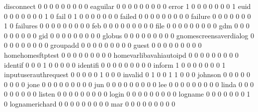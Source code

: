 \documentclass[compress,8pt]{beamer}
\begin{document}
\begin{frame}
\begin{Schunk}
  disconnect                                 0   0   0   0   0   0   0   0   0
  eaguilar                                   0   0   0   0   0   0   0   0   0
  error                                      1   0   0   0   0   0   0   0   1
  euid                                       0   0   0   0   0   0   0   1   0
  fail                                       0   1   0   0   0   0   0   0   0
  failed                                     0   0   0   0   0   0   0   0   0
  failure                                    0   0   0   0   0   0   0   1   0
  failures                                   0   0   0   0   0   0   0   0   0
  feb                                        0   0   0   0   0   0   0   0   0
  file                                       0   0   0   0   0   0   0   0   0
  gdm                                        0   0   0   0   0   0   0   0   0
  gid                                        0   0   0   0   0   0   0   0   0
  globus                                     0   0   0   0   0   0   0   0   0
  gnomescreensaverdialog                     0   0   0   0   0   0   0   0   0
  groupadd                                   0   0   0   0   0   0   0   0   0
  guest                                      0   0   0   0   0   0   0   0   0
  homehomesftptest                           0   0   0   0   0   0   0   0   0
  homevarlibavahiautoipd                     0   0   0   0   0   0   0   0   0
  identif                                    0   0   0   1   0   0   0   0   0
  identifi                                   0   0   0   0   0   0   0   0   0
  inform                                     1   0   0   0   0   0   0   0   1
  inputuserauthrequest                       0   0   0   0   0   1   0   0   0
  invalid                                    0   1   0   0   1   1   0   0   0
  johnson                                    0   0   0   0   0   0   0   0   0
  jone                                       0   0   0   0   0   0   0   0   0
  jun                                        0   0   0   0   0   0   0   0   0
  lee                                        0   0   0   0   0   0   0   0   0
  linda                                      0   0   0   0   0   0   0   0   0
  listen                                     0   0   0   0   0   0   0   0   0
  login                                      0   0   0   0   0   0   0   0   0
  logname                                    0   0   0   0   0   0   0   1   0
  lognamerichard                             0   0   0   0   0   0   0   0   0
  mar                                        0   0   0   0   0   0   0   0   0

\end{Schunk}
\end{frame}
\end{document}
